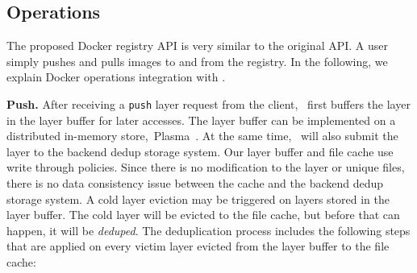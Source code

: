 \subsection{Operations}
\label{sec:design_operations}

%
The proposed Docker registry API is very similar to the original API.
A user simply pushes and pulls images to and from the registry. 
In the following, we explain Docker operations integration with \sysname.


\textbf{Push.}
After receiving a \texttt{push} layer request from the client, 
\sysname~first buffers the layer in the layer buffer for later accesses.
The layer buffer can be implemented on a distributed in-memory store,~\eg Plasma~\cite{plasma}.
At the same time, \sysname~will also submit the layer to the backend dedup storage system.
Our layer buffer and file cache use write through policies. 
Since there is no modification to the layer or unique files, 
there is no data consistency issue between the cache and the backend dedup storage system.
A cold layer eviction may be triggered on layers stored in the layer buffer.
The cold layer will be evicted to the file cache, but before that can happen, it will be \emph{deduped}.
The deduplication process includes the following steps 
that are applied on every victim layer evicted from the layer buffer to the file cache:

